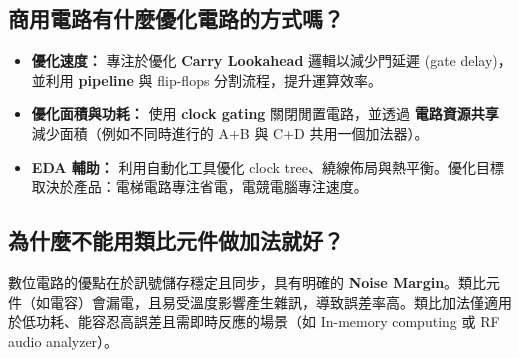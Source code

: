 \documentclass[12pt]{article}
\begin{document}
\subsection{商用電路有什麼優化電路的方式嗎？}
\begin{itemize}
\item \textbf{優化速度：} 專注於優化 \textbf{Carry Lookahead} 邏輯以減少門延遲 (gate delay)，並利用 \textbf{pipeline} 與 flip-flops 分割流程，提升運算效率。
\item \textbf{優化面積與功耗：} 使用 \textbf{clock gating} 關閉閒置電路，並透過 \textbf{電路資源共享} 減少面積（例如不同時進行的 A+B 與 C+D 共用一個加法器）。
\item \textbf{EDA 輔助：} 利用自動化工具優化 clock tree、繞線佈局與熱平衡。優化目標取決於產品：電梯電路專注省電，電競電腦專注速度。
\end{itemize}

\subsection{為什麼不能用類比元件做加法就好？}
數位電路的優點在於訊號儲存穩定且同步，具有明確的 \textbf{Noise Margin}。類比元件（如電容）會漏電，且易受溫度影響產生雜訊，導致誤差率高。類比加法僅適用於低功耗、能容忍高誤差且需即時反應的場景（如 In-memory computing 或 RF audio analyzer）。
\end{document}
